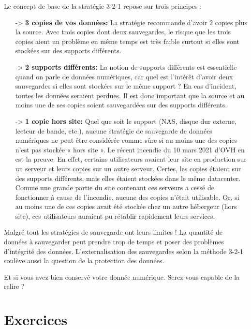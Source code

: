 \documentclass[11pt, a4paper]{book}
\begin{document}
Le concept de base de la stratégie 3-2-1 repose sur trois principes :
\begin{enumerate}
    \item[->] \textbf{{\huge 3} copies de vos données:} La stratégie recommande d’avoir 2 copies plus la source. Avec trois copies dont deux sauvegardes, le risque que les trois copies aient un problème en même temps est très faible surtout si elles sont stockées sur des supports différents.

    \item[->] \textbf{{\huge 2} supports différents:} La notion de supports différents est essentielle quand on parle de données numériques, car quel est l’intérêt d’avoir deux sauvegardes si elles sont stockées sur le même support ? En cas d’incident, toutes les données seraient perdues. Il est donc important que la source et au moins une de ses copies soient sauvegardées sur des supports différents.

    \item[->] \textbf{{\huge 1} copie hors site:} Quel que soit le support (NAS, disque dur externe, lecteur de bande, etc.), aucune stratégie de sauvegarde de données numériques ne peut être considérée comme sûre si au moins une des copies n’est pas stockée « hors site ». Le récent incendie du 10 mars 2021 d’OVH en est la preuve. En effet, certains utilisateurs avaient leur site en production sur un serveur et leurs copies sur un autre serveur. Certes, les copies étaient sur des supports différents, mais elles étaient stockées dans le même datacenter. Comme une grande partie du site contenant ces serveurs a cessé de fonctionner à cause de l’incendie, aucune des copies n’était utilisable. Or, si au moins une de ces copies avait été stockée chez un autre hébergeur (hors site), ces utilisateurs auraient pu rétablir rapidement leurs services.
\end{enumerate}

Malgré tout les stratégies de sauvegarde ont leurs limites ! La quantité de données à sauvegarder peut prendre trop de temps et poser des problèmes d’intégrité des données. L’externalisation des sauvegardes selon la méthode 3-2-1 soulève aussi la question de la protection des données. 

Et si vous avez bien conservé votre donnée numérique. Serez-vous capable de la relire ?

\section{Exercices}
\end{document}
